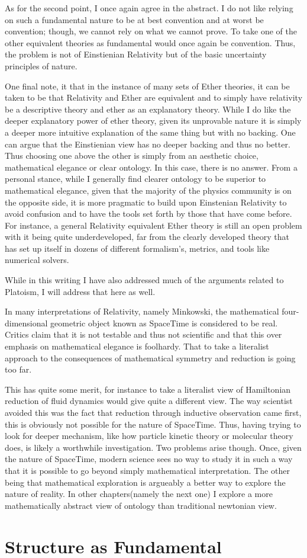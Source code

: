 As for the second point, I once again agree in the abstract. I do not like relying on such a fundamental nature to be at best convention and at worst
be convention; though, we cannot rely on what we cannot prove. To take one of the other equivalent theories as fundamental would once again be convention.
Thus, the problem is not of Einstienian Relativity but of the basic uncertainty principles of nature.

One final note, it that in the instance of many sets of Ether theories, it can be taken to be that Relativity and Ether are equivalent and to simply
have relativity be a descriptive theory and ether as an explanatory theory. While I do like the deeper explanatory power of ether theory, given
its unprovable nature it is simply a deeper more intuitive explanation of the same thing but with no backing. One can argue that the Einstienian
view has no deeper backing and thus no better. Thus choosing one above the other is simply from an aesthetic choice, mathematical elegance or clear
ontology. In this case, there is no answer. From a personal stance, while I generally find clearer ontology to be superior to mathematical elegance,
given that the majority of the physics community is on the opposite side, it is more pragmatic to build upon Einstenian Relativity to avoid confusion
and to have the tools set forth by those that have come before. For instance, a general Relativity equivalent Ether theory is still an open problem
with it being quite underdeveloped, far from the clearly developed theory that has set up itself in dozens of different formalism's, metrics, and
tools like numerical solvers.

While in this writing I have also addressed much of the arguments related to Platoism, I will address that here as well.

In many interpretations of Relativity, namely Minkowski, the mathematical four-dimensional geometric object known as SpaceTime is considered to be
real. Critics claim that it is not testable and thus not scientific and that this over emphasis on mathematical elegance is foolhardy. That to take
a literalist approach to the consequences of mathematical symmetry and reduction is going too far.

This has quite some merit, for instance to take a literalist view of Hamiltonian reduction of fluid dynamics would give quite a different view.
The way scientist avoided this was the fact that reduction through inductive observation came first, this is obviously not possible for the nature
of SpaceTime. Thus, having trying to look for deeper mechanism, like how particle kinetic theory or molecular theory does, is likely a worthwhile
investigation. Two problems arise though. Once, given the nature of SpaceTime, modern science sees no way to study it in such a way that it is possible
to go beyond simply mathematical interpretation. The other being that mathematical exploration is argueably a better way to explore the nature of
reality. In other chapters(namely the next one) I explore a more mathematically abstract view of ontology than traditional newtonian view.

\section{Structure as Fundamental}
